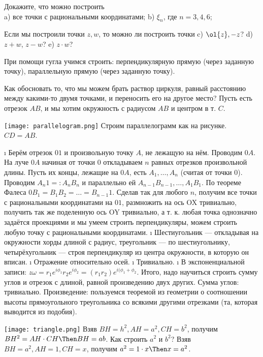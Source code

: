 \begin{problem}[38(9.6)]
Докажите, что можно построить\\ 
a) все точки с рациональными координатами;
b) $\xi_n$, где $n=3,4,6$;

Если мы построили точки $z,w$, то можно ли построить точки 
c) $\ol{z},-z$? 
d) $z+w$, $z-w$?
e) $z\cdot w$?
\end{problem}

\begin{solution}
При помощи гугла учимся строить: перпендикулярную прямую (через заданную точку), параллельную прямую (через заданную точку).

Как обосновать то, что мы можем брать раствор циркуля, равный расстоянию между какими-то двумя точками, и переносить его на другое место?
Пусть есть отрезок \(AB\), и мы хотим окружность с радиусом \(AB\) и центром в т. \(C\).

\texttt{[image: parallelogram.png]}
Строим параллелограмм как на рисунке.
\(CD = AB\).

\begin{enumerate}
\def\labelenumi{\alph{enumi})}
\i
  Берём отрезок \(01\) и произвольную точку \(A\), не лежащую на нём. Проводим \(0A\). На луче \(0A\) начиная от точки \(0\) откладываем \(n\) равных отрезков произвольной длины. Пусть их концы, лежащие на \(0A\), есть \(A_1, \dots, A_n\) (считая от точки \(0\)). Проводим \(A_n1 =: A_n B_n\) и параллельно ей \(A_{n-1}B_{n-1}, \dots, A_1B_1\). По теореме Фалеса \(0B_1 = B_1B_2 = \dots = B_{n-1}1\). Сделав так для любого \(n\), получим все точки с рациональными координатами на \(01\), размножить на ось OX тривиально, получить так же поделенную ось OY тривиально, а т. к. любая точка однозначно задаётся проекциями и мы умеем строить перпендикуляры, можем строить любую точку с рациональными координатами.
\i
  Шестиугольник --- откладывая на окружности хорды длиной с радиус, треугольник --- по шестиугольнику, четырёхугольник --- строя перпендикуляр из центра окружности, в которую он вписан.
\i
  Отражение относительно осей.
\i
  Тривиально.
\i
  В экспоненциальной записи: \(z\omega = r_1e^{i\phi_1}r_2e^{i\phi_2}=(r_1r_2)e^{i(\phi_1 +\phi_2}\).
  Итого, надо научиться строить сумму углов и отрезок с длиной, равной произведению двух других. Сумма углов: тривиально.
  Произведение: пользуемся теоремой из геометрии о соотношении высоты прямоугольного треугольника со всякими другими отрезками (та, которая выводится из подобия).

  \texttt{[image: triangle.png]}
  Взяв \(BH=h^2, AH=a^2, CH=b^2\), получим \(BH^2=AH\cdot CH \Then BH=ab\).
  Как строить \(a^2\) и \(b^2\)?
  Взяв \(BH=a^2, AH=1, CH=x\), получим \(a^2=1\cdot x \Then x=a^2\).
\end{enumerate}

\end{solution}


